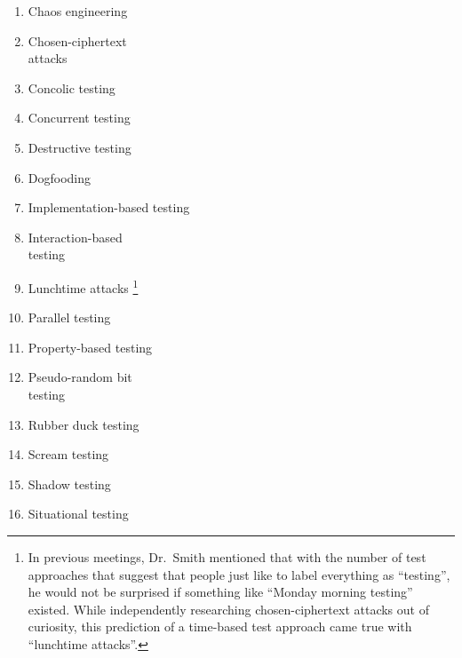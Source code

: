     \begin{minipage}{\textwidth}
        \begin{multicols}{2}
            \begin{enumerate}
                \item Chaos engineering
                \item Chosen-ciphertext \ifnotpaper\else \\ \fi attacks
                \item Concolic testing
                \item Concurrent testing
                \item Destructive testing
                \item Dogfooding
                \item Implementation-based testing
                \item Interaction-based \ifnotpaper\else \\ \fi testing
                      \ifnotpaper\else\columnbreak\fi
                \item Lunchtime attacks\ifnotpaper%
                          \footnote{In previous meetings, Dr.~Smith mentioned
                              that with the number of test approaches that suggest
                              that people just like to label everything as
                              ``testing'', he would not be surprised if something
                              like ``Monday morning testing'' existed. While
                              independently researching chosen-ciphertext attacks
                              out of curiosity, this prediction of a time-based
                              test approach came true with ``lunchtime attacks''.}
                      \fi
                \item Parallel testing
                \item Property-based testing
                \item Pseudo-random bit \ifnotpaper\else \\ \fi testing
                \item Rubber duck testing
                \item Scream testing
                \item Shadow testing
                \item Situational testing
            \end{enumerate}
        \end{multicols}
    \end{minipage}
\fi
